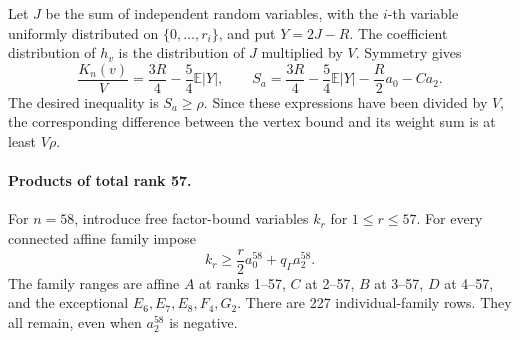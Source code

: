 \documentclass[11pt]{article}
\theoremstyle{definition}
\theoremstyle{remark}
\numberwithin{equation}{section}
\begin{document}
Let $J$ be the sum of independent random variables, with the $i$-th
variable uniformly distributed on $\{0,\ldots,r_i\}$, and put
$Y=2J-R$. The coefficient distribution
of $h_v$ is the distribution of $J$ multiplied by $V$. Symmetry gives
\begin{equation}\label{fv:normalized-ideal}
 \frac{K_n(v)}V=\frac{3R}{4}-\frac54\mathbb E|Y|,
 \qquad
 S_a=\frac{3R}{4}-\frac54\mathbb E|Y|-\frac R2a_0-Ca_2.
\end{equation}
The desired inequality is $S_a\ge\rho$. Since these expressions
have been divided by $V$, the corresponding difference between the
vertex bound and its weight sum is at least $V\rho$.

\paragraph{Products of total rank 57.}
For $n=58$, introduce free factor-bound variables $k_r$ for
$1\le r\le57$. For every connected affine family impose
\begin{equation}\label{fv:ideal-factor-links}
                 k_r\ge\frac r2a^{58}_0+q_\Gamma a^{58}_2.
\end{equation}
The family ranges are affine $A$ at ranks 1--57,
$C$ at 2--57, $B$ at 3--57, $D$ at 4--57, and the exceptional
$E_6,E_7,E_8,F_4,G_2$. There are 227 individual-family rows.
They all remain, even when $a^{58}_2$ is negative.
\end{document}
